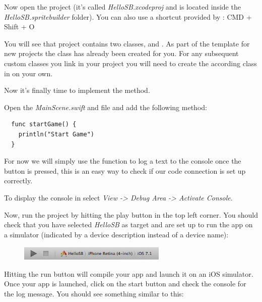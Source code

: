 \begin{leftbar}
Now open the \xcode{} project (it's called \textit{HelloSB.xcodeproj} and is
located inside the \textit{HelloSB.spritebuilder} folder). 
You can also use a shortcut provided by \SB{}: CMD + Shift + O
\end{leftbar}
You will see that
project contains two classes,  and
. As part of the template for new \SB{} projects the
 class has already been created for you. For any
subsequent custom classes you link in your \SB{} project you will need to create
the according class in \xcode{} on your own.

Now it's finally time to implement the  method. 

\begin{leftbar}
Open the \textit{MainScene.swift} and file and add the following method:

\begin{lstlisting}
  func startGame() {
    println("Start Game")
  }
\end{lstlisting} 
\end{leftbar}

For now we will simply use the  function to log a text to
the console once the button is pressed, this is an easy way to check if our code
connection is set up correctly.

\begin{details} 
To display the console in \xcode{} select \textit{View -> Debug Area ->
Activate Console}.
\end{details}

Now, run the \xcode{} project by hitting the play button in the top left corner.
You should check that you have selected \textit{HelloSB} as target and are set
up to run the app on a simulator (indicated by a device description instead of
a device name):
\begin{figure}[H]
		\centering
		\includegraphics[width=200pt]{images/firstproject/run_app.png}
\end{figure}
Hitting the run button will compile your app and launch it on an iOS simulator.
Once your app is launched, click on the start button and check the console for
the log message. You should see something similar to this:

